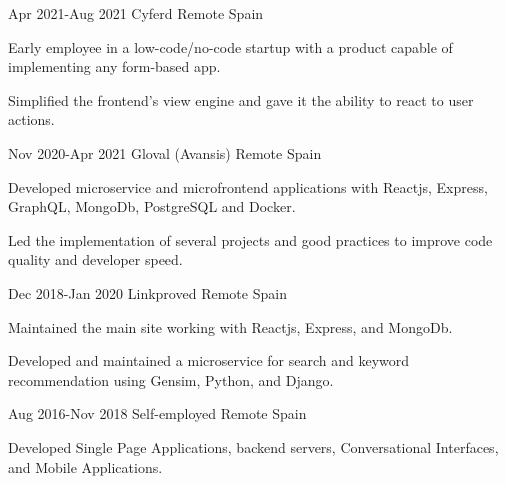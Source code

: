 \documentclass[10pt]{CurriculumVitae}
\begin{document}
      {Apr 2021-Aug 2021}
      {Cyferd}
      {Remote}
      {Spain}
      {
        \item Early employee in a low-code/no-code startup with a product capable of implementing any form-based app.
        \item Simplified the frontend's view engine and gave it the ability to react to user actions.
      }

      {Nov 2020-Apr 2021}
      {Gloval (Avansis)}
      {Remote}
      {Spain}
      {
        \item Developed microservice and microfrontend applications with Reactjs, Express, GraphQL, MongoDb, PostgreSQL and Docker.
        \item Led the implementation of several projects and good practices to improve code quality and developer speed. %
      }

      {Dec 2018-Jan 2020}
      {Linkproved}
      {Remote}
      {Spain}
      {
        \item Maintained the main site working with Reactjs, Express, and MongoDb.
        \item Developed and maintained a microservice for search and keyword recommendation using Gensim, Python, and Django.
      }
 
      {Aug 2016-Nov 2018}
      {Self-employed}
      {Remote}
      {Spain}
      {
        \item Developed Single Page Applications, backend servers, Conversational Interfaces, and Mobile Applications.
      }
   
\end{document}

